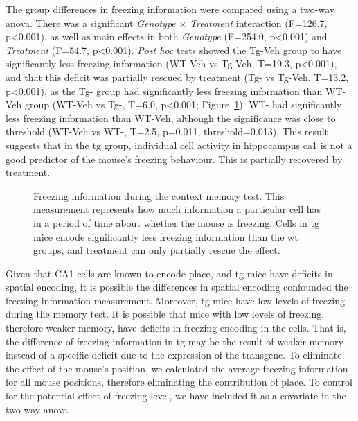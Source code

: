 The group differences in freezing information were compared using a two-way \gls{anova}. There was a significant \textit{Genotype} $\times$ \textit{Treatment} interaction (F=126.7, p<0.001), as well as main effects in both \textit{Genotype} (F=254.0, p<0.001) and \textit{Treatment} (F=54.7, p<0.001). \textit{Post hoc} tests showed the Tg-Veh group to have significantly less freezing information (WT-Veh vs Tg-Veh, T=19.3, p<0.001), and that this deficit was partially rescued by \tglu{} treatment (Tg-\glu{} vs Tg-Veh, T=13.2, p<0.001), as the Tg-\glu{} group had significantly less freezing information than WT-Veh group (WT-Veh vs Tg-\glu, T=6.0, p<0.001; Figure~\ref{f.ad.freeze_info}). WT-\glu{} had significantly less freezing information than WT-Veh, although the significance was close to threshold (WT-Veh vs WT-\glu, T=2.5, p=0.011, threshold=0.013). This result suggests that in the \gls{tg} group, individual cell activity in hippocampus \gls{ca1} is not a good predictor of the mouse's freezing behaviour. This is partially recovered by \tglu{} treatment. 
\begin{figure}[h]
    
    \caption[Freezing information during memory test.]{Freezing information during the context memory test. This measurement represents how much information a particular cell has in a period of time about whether the mouse is freezing. Cells in \gls{tg} mice encode significantly less freezing information than the \gls{wt} groups, and \tglu{} treatment can only partially rescue the effect. \label{f.ad.freeze_info}}
\end{figure}
    


Given that CA1 cells are known to encode place, and \gls{tg} mice have deficits in spatial encoding, it is possible the differences in  spatial encoding confounded the freezing information measurement. Moreover, \gls{tg} mice have low levels of freezing during the memory test. It is possible that mice with low levels of freezing, therefore weaker memory, have deficits in freezing encoding in the cells. That is, the difference of freezing information in \gls{tg} may be the result of weaker memory instead of a specific deficit due to the expression of the transgene. To eliminate the effect of the mouse's position, we calculated the average freezing information for all mouse positions, therefore eliminating the contribution of place. To control for the potential effect of freezing level, we have included it as a covariate in the two-way \gls{anova}. 

